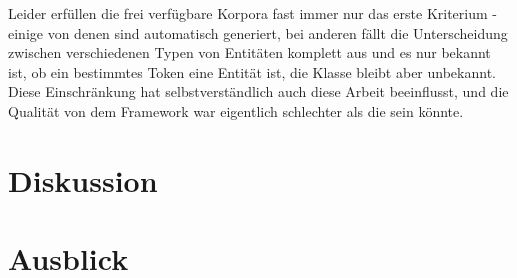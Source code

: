 Leider erfüllen die frei verfügbare Korpora fast immer nur das erste Kriterium - einige von denen sind automatisch generiert, bei anderen fällt die Unterscheidung zwischen verschiedenen Typen von Entitäten komplett aus und es nur bekannt ist, ob ein bestimmtes Token eine Entität ist, die Klasse bleibt aber unbekannt. Diese Einschränkung hat selbstverständlich auch diese Arbeit beeinflusst, und die Qualität von dem Framework war eigentlich schlechter als die sein könnte.

\section{Diskussion}

\section{Ausblick}
